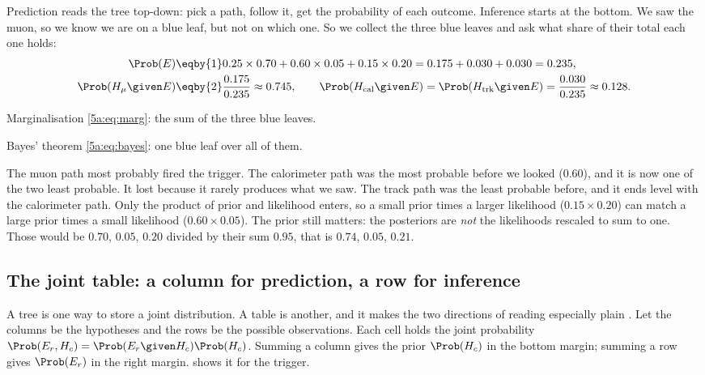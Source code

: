 Prediction reads the tree top-down: pick a path, follow it, get the probability of
each outcome. Inference starts at the bottom. We saw the muon, so we know we are
on a blue leaf, but not on which one. So we collect the three blue leaves and ask
what share of their total each one holds:
\begin{align*}
  \Prob(E)
  &\eqby{1}0.25\times0.70+0.60\times0.05+0.15\times0.20
   =0.175+0.030+0.030=0.235,\\
  \Prob(H_\mu\given E)
  &\eqby{2}\frac{0.175}{0.235}\approx0.745,\qquad
  \Prob(H_{\rm cal}\given E)=\Prob(H_{\rm trk}\given E)=\frac{0.030}{0.235}\approx0.128 .
\end{align*}
\begin{explain}
  \item Marginalisation \eqref{5a:eq:marg}: the sum of the three blue leaves.
  \item Bayes' theorem \eqref{5a:eq:bayes}: one blue leaf over all of them.
\end{explain}
The muon path most probably fired the trigger. The calorimeter path was the most
probable before we looked ($0.60$), and it is now one of the two least probable.
It lost because it rarely produces what we saw. The track path was the least
probable before, and it ends level with the calorimeter path. Only the product of
prior and likelihood enters, so a small prior times a larger likelihood
($0.15\times0.20$) can match a large prior times a small likelihood
($0.60\times0.05$). The prior still matters: the posteriors are \emph{not} the
likelihoods rescaled to sum to one. Those would be $0.70$, $0.05$, $0.20$ divided
by their sum $0.95$, that is $0.74$, $0.05$, $0.21$.

\subsection{The joint table: a column for prediction, a row for inference}

A tree is one way to store a joint distribution. A table is another, and it makes
the two directions of reading especially plain . Let the columns be the hypotheses and the rows be the
possible observations. Each cell holds the joint probability
$\Prob(E_r,H_c)=\Prob(E_r\given H_c)\Prob(H_c)$. Summing a column gives the
prior $\Prob(H_c)$ in the bottom margin; summing a row gives $\Prob(E_r)$ in the
right margin.  shows it for the trigger.


